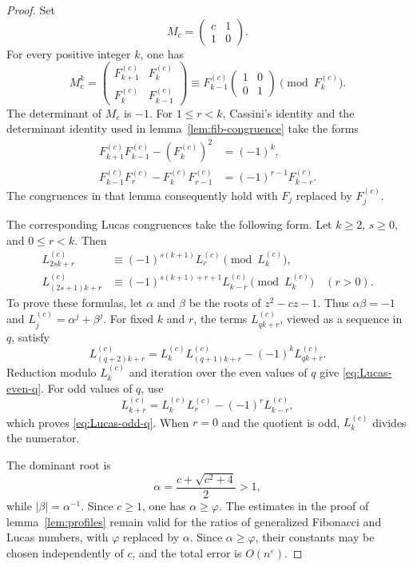 \documentclass[11pt]{article}
\newcommand{\eps}{\varepsilon}
\begin{document}
\begin{proof}
Set
\[
 M_c=\begin{pmatrix}c&1\\1&0\end{pmatrix}.
\]
For every positive integer $k$, one has
\[
 M_c^k=
 \begin{pmatrix}
  F_{k+1}^{(c)}&F_k^{(c)}\\
  F_k^{(c)}&F_{k-1}^{(c)}
 \end{pmatrix}
 \equiv F_{k-1}^{(c)}
 \begin{pmatrix}1&0\\0&1\end{pmatrix}
 \pmod {F_k^{(c)}}.
\]
The determinant of $M_c$ is $-1$. For $1\leq r<k$, Cassini's identity and
the determinant identity used in lemma~\ref{lem:fib-congruence} take the forms
\begin{align*}
 F_{k+1}^{(c)}F_{k-1}^{(c)}-(F_k^{(c)})^2&=(-1)^k,\\
 F_{k-1}^{(c)}F_r^{(c)}-F_k^{(c)}F_{r-1}^{(c)}
 &=(-1)^{r-1}F_{k-r}^{(c)}.
\end{align*}
The congruences in that lemma consequently hold with $F_j$ replaced by
$F_j^{(c)}$.

The corresponding Lucas congruences take the following form. Let $k\geq 2$,
$s\geq 0$, and $0\leq r<k$. Then
\begin{align}
 L_{2sk+r}^{(c)}&\equiv
 (-1)^{s(k+1)}L_r^{(c)}\pmod {L_k^{(c)}},
 \label{eq:Lucas-even-q}\\
 L_{(2s+1)k+r}^{(c)}&\equiv
 (-1)^{s(k+1)+r+1}L_{k-r}^{(c)}\pmod {L_k^{(c)}}
 \quad (r>0).
 \label{eq:Lucas-odd-q}
\end{align}
To prove these formulas, let $\alpha$ and $\beta$ be the roots of
$z^2-cz-1$. Thus $\alpha\beta=-1$ and
$L_j^{(c)}=\alpha^j+\beta^j$. For fixed $k$ and $r$, the terms
$L_{qk+r}^{(c)}$, viewed as a sequence in $q$, satisfy
\[
 L_{(q+2)k+r}^{(c)}
 =L_k^{(c)}L_{(q+1)k+r}^{(c)}-(-1)^kL_{qk+r}^{(c)}.
\]
Reduction modulo $L_k^{(c)}$ and iteration over the even values of $q$ give
\eqref{eq:Lucas-even-q}. For odd values of $q$, use
\[
 L_{k+r}^{(c)}=L_k^{(c)}L_r^{(c)}-(-1)^rL_{k-r}^{(c)},
\]
which proves \eqref{eq:Lucas-odd-q}. When $r=0$ and the quotient is odd,
$L_k^{(c)}$ divides the numerator.

The dominant root is
\[
 \alpha=\frac{c+\sqrt{c^2+4}}{2}>1,
\]
while $|\beta|=\alpha^{-1}$. Since $c\geq 1$, one has $\alpha\geq\varphi$.
The estimates in the proof of lemma~\ref{lem:profiles} remain valid for the
ratios of generalized Fibonacci and Lucas numbers, with $\varphi$ replaced
by $\alpha$. Since $\alpha\geq\varphi$, their constants may be chosen
independently of $c$, and the total error is $O(n^\eps)$.


\end{proof}
\end{document}
